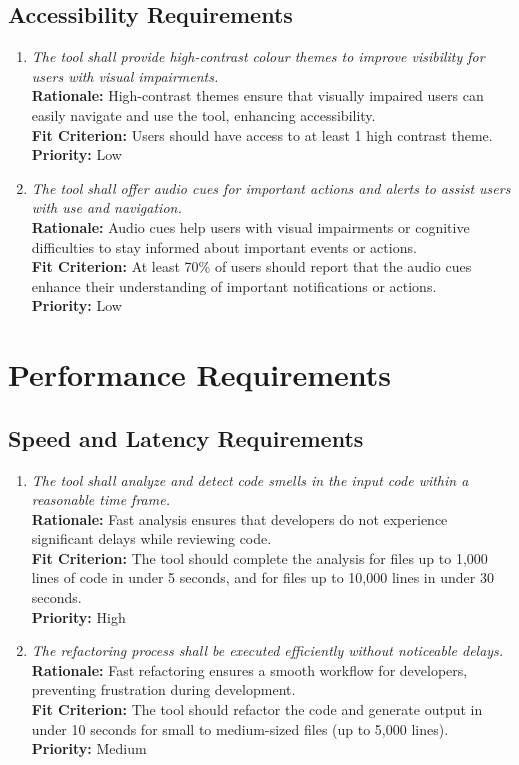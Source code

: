 \documentclass[12pt]{article}
\begin{document}
\subsection{Accessibility Requirements}
\begin{enumerate}[label=UHR-ACS \arabic*., wide=0pt, leftmargin=*]
    \item \emph{The tool shall provide high-contrast colour themes to improve visibility for users with visual impairments.}\\
    {\bf Rationale:} High-contrast themes ensure that visually impaired users can easily navigate and use the tool, enhancing accessibility.\\
    {\bf Fit Criterion:} Users should have access to at least 1 high contrast theme.\\
    {\bf Priority:} Low
    \item \emph{The tool shall offer audio cues for important actions and alerts to assist users with use and navigation.}\\
    {\bf Rationale:} Audio cues help users with visual impairments or cognitive difficulties to stay informed about important events or actions.\\
    {\bf Fit Criterion:} At least 70\% of users should report that the audio cues enhance their understanding of important notifications or actions.\\
    {\bf Priority:} Low
\end{enumerate}

\section{Performance Requirements}
\subsection{Speed and Latency Requirements}
\begin{enumerate}[label=PR-SL \arabic*., wide=0pt, leftmargin=*]
    \item \emph{The tool shall analyze and detect code smells in the input code within a reasonable time frame.}\\
    {\bf Rationale:} Fast analysis ensures that developers do not experience significant delays while reviewing code.\\
    {\bf Fit Criterion:} The tool should complete the analysis for files up to 1,000 lines of code in under 5 seconds, and for files up to 10,000 lines in under 30 seconds.\\
    {\bf Priority:} High
    \item \emph{The refactoring process shall be executed efficiently without noticeable delays.}\\
    {\bf Rationale:} Fast refactoring ensures a smooth workflow for developers, preventing frustration during development.\\
    {\bf Fit Criterion:} The tool should refactor the code and generate output in under 10 seconds for small to medium-sized files (up to 5,000 lines).\\
    {\bf Priority:} Medium
\end{enumerate}
\end{document}
